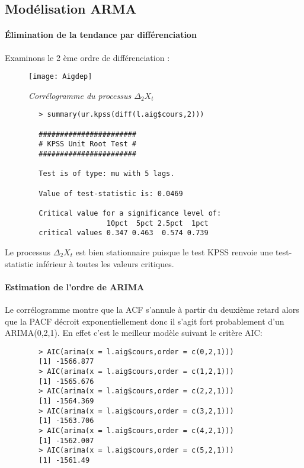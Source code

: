     \subsection{Modélisation ARMA}       
        \paragraph{Élimination de la tendance par différenciation } Examinons le 2
        ème ordre de différenciation :
        \begin{figure}[H]
            \centering 
            \label{fig:Aigdep} 
            \texttt{[image: Aigdep]} 
            \caption{\it Corrélogramme du processus $\Delta_2 X_t$ } 
        \end{figure} 
        \begin{verbatim}
        > summary(ur.kpss(diff(l.aig$cours,2)))

        ####################### 
        # KPSS Unit Root Test # 
        ####################### 

        Test is of type: mu with 5 lags. 

        Value of test-statistic is: 0.0469 

        Critical value for a significance level of: 
                        10pct  5pct 2.5pct  1pct
        critical values 0.347 0.463  0.574 0.739
        \end{verbatim}
        Le processus $\Delta_2 X_t$ est bien stationnaire puisque le test KPSS renvoie une
        test-statistic inférieur à toutes les valeurs critiques.
        \paragraph{Estimation de l'ordre de ARIMA} Le corrélogramme montre que
        la ACF s'annule  à partir du deuxième retard alors que la PACF décroit
        exponentiellement donc il s'agit fort probablement d'un ARIMA(0,2,1). 
        En effet c'est le meilleur modèle suivant le critère AIC:
        \begin{verbatim}
        > AIC(arima(x = l.aig$cours,order = c(0,2,1)))
        [1] -1566.877
        > AIC(arima(x = l.aig$cours,order = c(1,2,1)))
        [1] -1565.676
        > AIC(arima(x = l.aig$cours,order = c(2,2,1)))
        [1] -1564.369
        > AIC(arima(x = l.aig$cours,order = c(3,2,1)))
        [1] -1563.706
        > AIC(arima(x = l.aig$cours,order = c(4,2,1)))
        [1] -1562.007
        > AIC(arima(x = l.aig$cours,order = c(5,2,1)))
        [1] -1561.49
        \end{verbatim}
